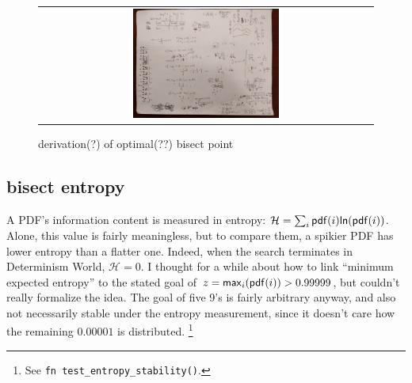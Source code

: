 \documentclass[11pt]{sigplanconf}
\begin{document}
\begin{figure}[t]
	\begin{tabular}{c}
		\includegraphics[width=0.45\textwidth]{horses.jpg}
	\end{tabular}
	\caption{derivation(?) of optimal(??) bisect point}
	\label{fig:let-me-shown-that-my-work}
\end{figure}


%
%
% 
%
%
%
%
%
%
%


\subsection{bisect entropy}
\label{sec:entropy}

\newcommand\entropy{\ensuremath{\mathcal{H}}\xspace}

A PDF's information content is measured in entropy:
$\entropy = \sum_i \pdf(i)\mathsf{ln}(\pdf(i))$.
Alone, this value is fairly meaningless, but to compare them,
a spikier PDF has lower entropy than a flatter one.
Indeed,
when the search terminates in Determinism World, $\entropy = 0$.
I thought for a while about how to link ``minimum expected entropy''
to the stated goal %
of
$z = \mathsf{max}_i (\mathsf{pdf}(i)) > 0.99999$,
but couldn't really formalize the idea.
The goal of five 9's is fairly arbitrary anyway,
and also not necessarily stable under the entropy measurement,
since it doesn't care how the remaining $0.00001$ is distributed.%
\footnote{See {\tt fn test\_entropy\_stability()}.}
\end{document}
